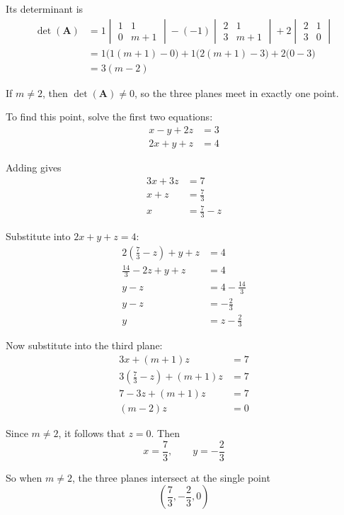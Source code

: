 \documentclass[leqno]{article}
\begin{document}
\begin{enumerate}[
  label=\textbf{\arabic*.},
  leftmargin=*,
  topsep=0pt,
  partopsep=0pt,
  parsep=0pt
]
\begin{djsSolution}
\begin{enumerate}[label=\textbf{(\alph*)}]
Its determinant is
\begin{align*}
\det(\mathbf{A})
&=1\begin{vmatrix}1&1\\0&m+1\end{vmatrix}
-(-1)\begin{vmatrix}2&1\\3&m+1\end{vmatrix}
+2\begin{vmatrix}2&1\\3&0\end{vmatrix}\\
&=1\bigl(1(m+1)-0\bigr)
+1\bigl(2(m+1)-3\bigr)
+2\bigl(0-3\bigr)\\
&=3(m-2)
\end{align*}

If \(m\ne 2\), then \(\det(\mathbf{A})\ne 0\), so the three planes meet in exactly one point.

To find this point, solve the first two equations:
\begin{align*}
x-y+2z&=3\\
2x+y+z&=4
\end{align*}

Adding gives
\begin{align*}
3x+3z&=7\\
x+z&=\frac73\\
x&=\frac73-z
\end{align*}

Substitute into \(2x+y+z=4\):
\begin{align*}
2\left(\frac73-z\right)+y+z&=4\\
\frac{14}{3}-2z+y+z&=4\\
y-z&=4-\frac{14}{3}\\
y-z&=-\frac23\\
y&=z-\frac23
\end{align*}

Now substitute into the third plane:
\begin{align*}
3x+(m+1)z&=7\\
3\left(\frac73-z\right)+(m+1)z&=7\\
7-3z+(m+1)z&=7\\
(m-2)z&=0
\end{align*}

Since \(m\ne 2\), it follows that \(z=0\). Then
\[
x=\frac73,\qquad y=-\frac23
\]

So when \(m\ne 2\), the three planes intersect at the single point
\[
\left(\frac73,-\frac23,0\right)
\]


\end{enumerate}
\end{djsSolution}
\end{enumerate}
\end{document}
